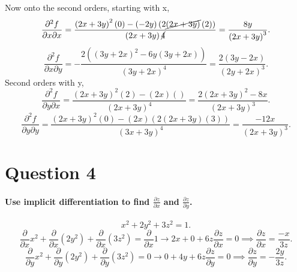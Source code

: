 Now onto the second orders, starting with x,
\[
\frac{ \partial^2 f}{\partial x \partial x } = \frac{ \left( 2x+3y \right) ^2\left( 0 \right) - \left( -2y \right) \left( 2\cancel{ \left( 2x+3y \right)  }\left( 2 \right)  \right)  }{ \left( 2x+3y \right) \cancel{ 4 } } = \frac{ 8y }{ \left( 2x+3y \right) ^3 }
.\] 
\[
\frac{ \partial^2 f}{\partial x \partial y} = -\frac{ 2\left( \left( 3y+2x \right) ^2-6y\left( 3y+2x \right)  \right)  }{ \left( 3y+2x \right) ^{ 4 } } = \frac{ 2\left( 3y-2x \right)  }{ \left( 2y+2x \right) ^3 }
.\] 
Second orders with y,
\[
\frac{ \partial^2 f}{\partial y \partial x} = \frac{ \left( 2x+3y \right) ^2 \left( 2 \right) - \left( 2x \right) \left(  \right)  }{ \left( 2x+3y \right) ^{ 4 } } = \frac{ 2\left( 2x+3y \right) ^2  - 8x }{ \left( 2x+3y \right) ^3 }
.\] 
\[
\frac{ \partial^2 f}{\partial y \partial y} = \frac{ \left( 2x+3y \right) ^2\left( 0 \right) - \left( 2x \right) \left( 2\left( 2x+3y \right) \left( 3 \right)  \right)  }{ \left( 3x+3y \right) ^{ 4 } } = \frac{ -12x }{ \left( 2x+3y \right) ^3 }
.\] 

\section{Question 4}%
\label{sec: Question 4 }
\paragraph{Use implicit differentiation to find $ \frac{ \partial z}{\partial x}  $ and $ \frac{ \partial z}{\partial y}  $.}
\[
x^2+2y^2+3z^2=1
.\] 
\[
\frac{ \partial }{\partial x} x^2 + \frac{ \partial }{\partial x} \left( 2y^2 \right) + \frac{ \partial }{\partial x} \left( 3z^2 \right) = \frac{ \partial }{\partial x} 1 \to 2x + 0 + 6z \frac{ \partial z}{\partial x} = 0 \implies \frac{ \partial z}{\partial x} = \frac{ -x }{ 3z }
.\] 
\[
\frac{ \partial }{\partial y} x^2 + \frac{ \partial }{\partial y} \left( 2y^2 \right) + \frac{ \partial }{\partial y} \left( 3z^2 \right) = 0 \to 0 + 4y + 6z \frac{ \partial z}{\partial y} = 0 \implies \frac{ \partial z}{\partial y} = -\frac{ 2y }{ 3z } 
.\] 

